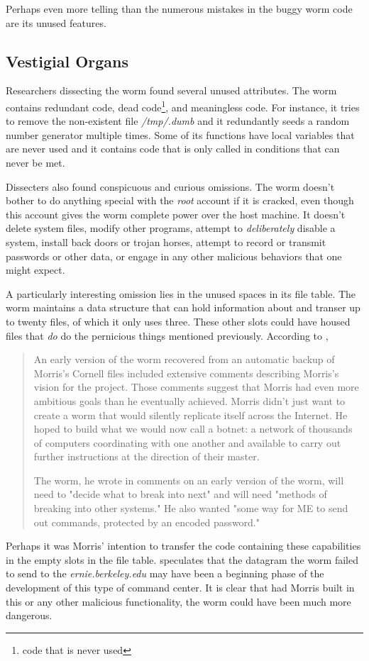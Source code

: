Perhaps even more telling than the numerous mistakes in the buggy worm code
are its unused features.


\subsection*{Vestigial Organs}

Researchers dissecting the worm found several
unused attributes. The worm contains redundant code, dead code\footnote{code
that is never used}, and meaningless code. For instance, it tries to remove the
non-existent file \textit{/tmp/.dumb} and it redundantly seeds a random number
generator multiple times. Some of its functions have local variables that are
never used and it contains code that is only called in conditions that can
never be met. 

Dissecters also found conspicuous and curious omissions. The worm doesn't bother
to do anything special with the \textit{root} account if it is cracked, even
though this account gives the worm complete power over the host machine.
It doesn't delete system files, modify other programs, attempt to
\textit{deliberately} disable a system, install back doors or trojan horses,
attempt to record or transmit passwords or other data, or engage in any other
malicious behaviors that one might expect. 

A particularly interesting omission lies in the unused spaces in its file table.
The worm maintains a data structure that can hold information about and transer
up to twenty files, of which it only uses three. These other slots could have
housed files that \textit{do} do the pernicious things
mentioned previously. According to \cite{lee_washpost_2013},

\begin{quote}
An early version of the worm recovered from an automatic backup of Morris's
Cornell files included extensive comments describing Morris's vision for the
project. Those comments suggest that Morris had even more ambitious goals than
he eventually achieved. Morris didn't just want to create a worm that would
silently replicate itself across the Internet. He hoped to build what we would
now call a botnet: a network of thousands of computers coordinating with one
another and available to carry out further instructions at the direction of
their master.

The worm, he wrote in comments on an early version of the worm, will need to
"decide what to break into next" and will need "methods of breaking into other
systems." He also wanted "some way for ME to send out commands, protected by an
encoded password."
\end{quote}

Perhaps it was Morris' intention to transfer the code containing these
capabilities in the empty slots in the file table. \cite{lee_washpost_2013}
speculates that the datagram the worm failed to send to the 
\textit{ernie.berkeley.edu} may have been a beginning phase of the development
of this type of command center. It is clear that had Morris built in this or
any other malicious functionality, the worm could have been much more dangerous. 

